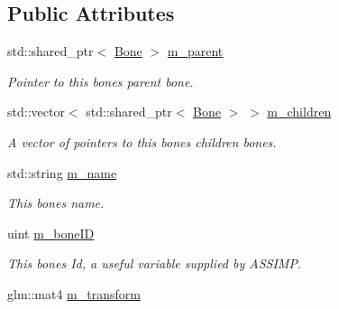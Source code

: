 \subsection*{Public Attributes}
\begin{DoxyCompactItemize}
\item 
std\+::shared\+\_\+ptr$<$ \hyperlink{classBone}{Bone} $>$ \hyperlink{classBone_a4bc89143d4239e43350e7c6c8cfd2dde}{m\+\_\+parent}\hypertarget{classBone_a4bc89143d4239e43350e7c6c8cfd2dde}{}\label{classBone_a4bc89143d4239e43350e7c6c8cfd2dde}

\begin{DoxyCompactList}\small\item\em Pointer to this bones parent bone. \end{DoxyCompactList}\item 
std\+::vector$<$ std\+::shared\+\_\+ptr$<$ \hyperlink{classBone}{Bone} $>$ $>$ \hyperlink{classBone_a97d1daabafdc0207e358699fb0112100}{m\+\_\+children}\hypertarget{classBone_a97d1daabafdc0207e358699fb0112100}{}\label{classBone_a97d1daabafdc0207e358699fb0112100}

\begin{DoxyCompactList}\small\item\em A vector of pointers to this bones children bones. \end{DoxyCompactList}\item 
std\+::string \hyperlink{classBone_a86934de3fefd07414fefb17d7638061b}{m\+\_\+name}\hypertarget{classBone_a86934de3fefd07414fefb17d7638061b}{}\label{classBone_a86934de3fefd07414fefb17d7638061b}

\begin{DoxyCompactList}\small\item\em This bones name. \end{DoxyCompactList}\item 
uint \hyperlink{classBone_a97e6e95c5d28881cd1c8d010abff1c5e}{m\+\_\+bone\+ID}\hypertarget{classBone_a97e6e95c5d28881cd1c8d010abff1c5e}{}\label{classBone_a97e6e95c5d28881cd1c8d010abff1c5e}

\begin{DoxyCompactList}\small\item\em This bones Id, a useful variable supplied by A\+S\+S\+I\+MP. \end{DoxyCompactList}\item 
glm\+::mat4 \hyperlink{classBone_aa078590b76fea365cebb4e6d8c940239}{m\+\_\+transform}\hypertarget{classBone_aa078590b76fea365cebb4e6d8c940239}{}\label{classBone_aa078590b76fea365cebb4e6d8c940239}


\end{DoxyCompactItemize}
